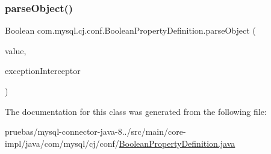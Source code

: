 \subsubsection{\texorpdfstring{parse\+Object()}{parseObject()}}
{\footnotesize\ttfamily Boolean com.\+mysql.\+cj.\+conf.\+Boolean\+Property\+Definition.\+parse\+Object (\begin{DoxyParamCaption}\item[{String}]{value,  }\item[{\mbox{\hyperlink{interfacecom_1_1mysql_1_1cj_1_1exceptions_1_1_exception_interceptor}{Exception\+Interceptor}}}]{exception\+Interceptor }\end{DoxyParamCaption})}



The documentation for this class was generated from the following file\+:\begin{DoxyCompactItemize}
\item 
pruebas/mysql-\/connector-\/java-\/8../src/main/core-\/impl/java/com/mysql/cj/conf/\mbox{\hyperlink{_boolean_property_definition_8java}{Boolean\+Property\+Definition.\+java}}\end{DoxyCompactItemize}
